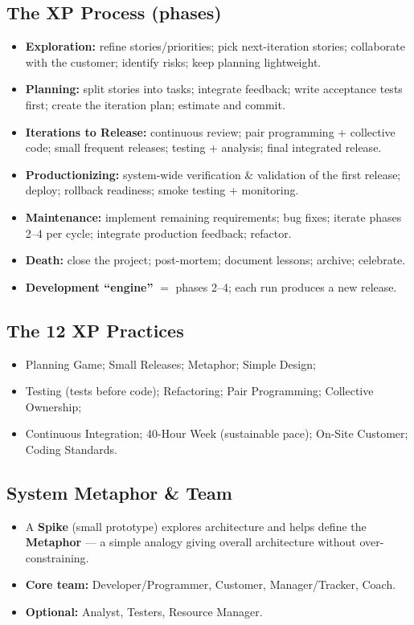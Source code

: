 \documentclass[hidelinks]{article}
\begin{document}
\subsection{The XP Process (phases)}
\begin{itemize}
  \item \textbf{Exploration:} refine stories/priorities; pick next-iteration stories; collaborate
        with the customer; identify risks; keep planning lightweight.
  \item \textbf{Planning:} split stories into tasks; integrate feedback; write acceptance tests
        first; create the iteration plan; estimate and commit.
  \item \textbf{Iterations to Release:} continuous review; pair programming + collective code;
        small frequent releases; testing + analysis; final integrated release.
  \item \textbf{Productionizing:} system-wide verification \& validation of the first release;
        deploy; rollback readiness; smoke testing + monitoring.
  \item \textbf{Maintenance:} implement remaining requirements; bug fixes; iterate phases 2--4 per
        cycle; integrate production feedback; refactor.
  \item \textbf{Death:} close the project; post-mortem; document lessons; archive; celebrate.
  \item \textbf{Development ``engine''} $=$ phases 2--4; each run produces a new release.
\end{itemize}

\subsection{The 12 XP Practices}
\begin{itemize}
  \item Planning Game; Small Releases; Metaphor; Simple Design;
  \item Testing (tests before code); Refactoring; Pair Programming; Collective Ownership;
  \item Continuous Integration; 40-Hour Week (sustainable pace); On-Site Customer; Coding Standards.
\end{itemize}

\subsection{System Metaphor \& Team}
\begin{itemize}
  \item A \textbf{Spike} (small prototype) explores architecture and helps define the
        \textbf{Metaphor} --- a simple analogy giving overall architecture without over-constraining.
  \item \textbf{Core team:} Developer/Programmer, Customer, Manager/Tracker, Coach.
  \item \textbf{Optional:} Analyst, Testers, Resource Manager.
\end{itemize}
\end{document}
